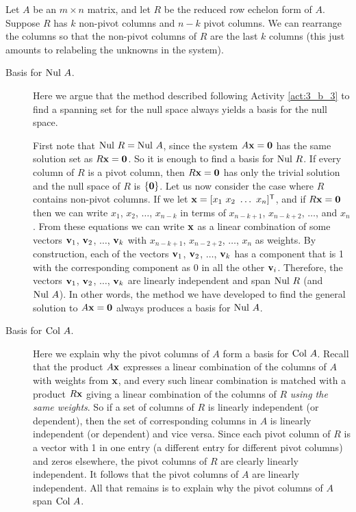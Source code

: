 Let $A$ be an $m \times n$ matrix, and let $R$ be the reduced row echelon form of $A$. Suppose $R$ has $k$ non-pivot columns and $n-k$ pivot columns. We can rearrange the columns so that the non-pivot columns of $R$ are the last $k$ columns (this just amounts to relabeling the unknowns in the system).

\begin{description}
\item[Basis for $\text{Nul } A$.] Here we argue that the method described following Activity \ref{act:3_b_3} to find a spanning set for the null space always yields a basis for the null space.

First note that $\text{Nul } R = \text{Nul } A$, since the system $A\mathbf{x} = \mathbf{0}$ has the same solution set as $R \mathbf{x} = \mathbf{0}$. So it is enough to find a basis for $\text{Nul } R$. If every column of $R$ is a pivot column, then $R \mathbf{x} = \mathbf{0}$ has only the trivial solution and the null space of $R$ is $\{ \mathbf{0} \}$. Let us now consider the case where $R$ contains non-pivot columns. If we let $\mathbf{x} = [x_1 \ x_2 \ \ldots \ x_n]^{\mathsf{T}}$, and if $R\mathbf{x} = \mathbf{0}$ then we can write $x_1$, $x_2$, $\ldots$, $x_{n-k}$ in terms of $x_{n-k+1}$, $x_{n-k+2}$, $\ldots$, and $x_n$. From these equations we can write $\mathbf{x}$ as a linear combination of some vectors $\mathbf{v}_1$, $\mathbf{v}_2$, $\ldots$, $\mathbf{v}_k$ with $x_{n-k+1}$, $x_{n-2+2}$, $\ldots$, $x_n$ as weights. By construction, each of the vectors $\mathbf{v}_1$, $\mathbf{v}_2$, $\ldots$, $\mathbf{v}_k$ has a component that is 1 with the corresponding component as 0 in all the other $\mathbf{v}_i$. Therefore, the vectors $\mathbf{v}_1$, $\mathbf{v}_2$, $\ldots$, $\mathbf{v}_k$ are linearly independent and span $\text{Nul } R$ (and $\text{Nul } A$). In other words, the method we have developed to find the general solution to $A \mathbf{x} = \mathbf{0}$ always produces a basis for $\text{Nul } A$.
\item[Basis for $\text{Col } A$.] Here we explain why the pivot columns of $A$ form a basis for $\text{Col } A$.  Recall that the product $A \mathbf{x}$ expresses a linear combination of the columns of $A$ with weights from $\mathbf{x}$, and every such linear combination is matched with a product $R \mathbf{x}$ giving a linear combination of the columns of $R$ \emph{using the same weights}. So if a set of columns of $R$ is linearly independent (or dependent), then the set of corresponding columns in $A$ is linearly independent (or dependent) and vice versa. Since each pivot column of $R$ is a vector with 1 in one entry (a different entry for different pivot columns) and zeros elsewhere, the pivot columns of $R$ are clearly linearly independent. It follows that the pivot columns of $A$ are linearly independent. All that remains is to explain why the pivot columns of $A$ span $\text{Col } A$. 


\end{description}
